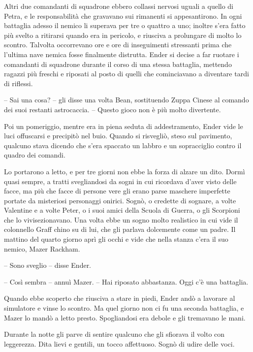 {Altri due comandanti di squadrone ebbero collassi nervosi uguali a
	quello di Petra, e le responsabilità che gravavano sui rimanenti si
	appesantirono. In ogni battaglia adesso il nemico li superava per tre o
	quattro a uno; inoltre s'era fatto più svelto a ritirarsi quando era in
	pericolo, e riusciva a prolungare di molto lo scontro. Talvolta
	occorrevano ore e ore di inseguimenti stressanti prima che l'ultima nave
	nemica fosse finalmente distrutta. Ender si decise a far ruotare i
	comandanti di squadrone durante il corso di una stessa battaglia,
	mettendo ragazzi più freschi e riposati al posto di quelli che
	cominciavano a diventare tardi di riflessi.}

{-- Sai una cosa? -- gli disse una volta Bean, sostituendo Zuppa Cinese
	al comando dei suoi restanti astrocaccia. -- Questo gioco non è più
	molto divertente.}

{Poi un pomeriggio, mentre era in piena seduta di addestramento, Ender
	vide le luci offuscarsi e precipitò nel buio. Quando si risvegliò, steso
	sul pavimento, qualcuno stava dicendo che s'era spaccato un labbro e un
	sopracciglio contro il quadro dei comandi.}

{Lo portarono a letto, e per tre giorni non ebbe la forza di alzare un
	dito. Dormì quasi sempre, a tratti svegliandosi da sogni in cui
	ricordava d'aver visto delle facce, ma più che facce di persone vere gli
	erano parse maschere imperfette portate da misteriosi personaggi
	onirici. Sognò, o credette di sognare, a volte Valentine e a volte
	Peter, o i suoi amici della Scuola di Guerra, o gli Scorpioni che lo
	vivisezionavano. Una volta ebbe un sogno molto realistico in cui vide il
	colonnello Graff chino su di lui, che gli parlava dolcemente come un
	padre. Il mattino del quarto giorno aprì gli occhi e vide che nella
	stanza c'era il suo nemico, Mazer Rackham.}

{-- Sono sveglio -- disse Ender.}

{-- Così sembra -- annuì Mazer. -- Hai riposato abbastanza. Oggi c'è una
	battaglia.}

{Quando ebbe scoperto che riusciva a stare in piedi, Ender andò a
	lavorare al simulatore e vinse lo scontro. Ma quel giorno non ci fu una
	seconda battaglia, e Mazer lo mandò a letto presto. Spogliandosi era
	debole e gli tremavano le mani.}

{Durante la notte gli parve di sentire qualcuno che gli sfiorava il
	volto con leggerezza. Dita lievi e gentili, un tocco affettuoso. Sognò
	di udire delle voci.}

